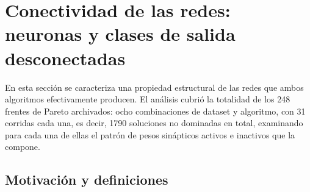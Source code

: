 






\section{Conectividad de las redes: neuronas y clases de salida desconectadas}
\label{sec:conectividad}

En esta sección se caracteriza una propiedad estructural de las redes que ambos algoritmos efectivamente producen. El análisis cubrió la totalidad de los 248 frentes de Pareto archivados: ocho combinaciones de dataset y algoritmo, con 31 corridas cada una, es decir, 1790 soluciones no dominadas en total, examinando para cada una de ellas el patrón de pesos sinápticos activos e inactivos que la compone.

\subsection{Motivación y definiciones}
\label{sec:conectividad-motivacion}

